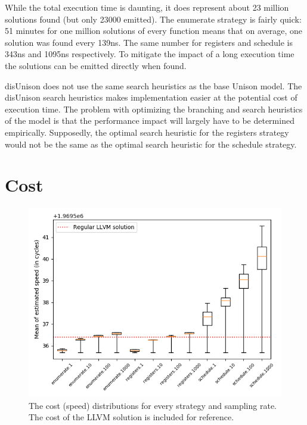 While the total execution time is daunting, it does represent about 23 million solutions
found (but only 23000 emitted). The enumerate strategy is fairly quick: 51 minutes for one
million solutions of every function means that on average, one solution was found every
139ns. The same number for registers and schedule is 343ns and 1095ns respectively. To
mitigate the impact of a long execution time the solutions can be emitted directly when
found.

disUnison does not use the same search heuristics as the base Unison model. The disUnison
search heuristics makes implementation easier at the potential cost of execution time. The
problem with optimizing the branching and search heuristics of the model is that the
performance impact will largely have to be determined empirically. Supposedly, the optimal
search heuristic for the registers strategy would not be the same as the optimal search
heuristic for the schedule strategy.

\section{Cost}
\label{sec:cost_result}

\begin{figure}[ht]
	\centering
	\includegraphics[width=\textwidth,height=0.5\textheight]{results/figures/cost_speed}
	\caption{The cost (speed) distributions for every strategy and sampling rate. The cost of the LLVM solution is included for reference.}
	\label{fig:cost-speed}
\end{figure}

